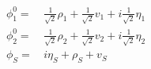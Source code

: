 \begin{align} 
\phi_1^0 = & \, \frac{1}{\sqrt{2}} \rho_1  + \frac{1}{\sqrt{2}} v_1  + i \frac{1}{\sqrt{2}} \eta_1 \\ 
\phi_2^0 = & \, \frac{1}{\sqrt{2}} \rho_2  + \frac{1}{\sqrt{2}} v_2  + i \frac{1}{\sqrt{2}} \eta_2 \\ 
\phi_S = & \, i \eta_S  + \rho_S + v_S
\end{align} 
